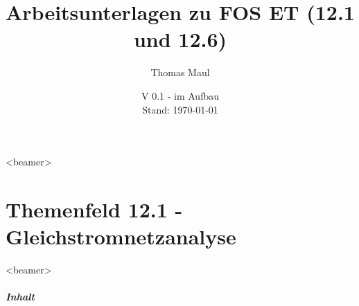 \documentclass[aspectratio=169, ignorenonframetext]{beamer}
\title{Arbeitsunterlagen zu FOS ET (12.1 und 12.6)}
\date{V 0.1 - im Aufbau\\ Stand: \today}%
\institute[BWS Hofheim]{Brühlwiesenschule, Hofheim}
\author{Thomas Maul}
\begin{document}
\begin{frame}<beamer>
  \titlepage
\end{frame}


\part{Themenfeld 12.1 - Gleichstromnetzanalyse}
\begin{frame}
  \partpage
\end{frame}
\begin{frame}<beamer>
      \frametitle{Inhalt}
  \begin{columns}
    \tableofcontents[sections={1-3},hidesubsections]%
    \tableofcontents[sections={4-},hidesubsections]%
  \end{columns}
\end{frame}
\end{document}
